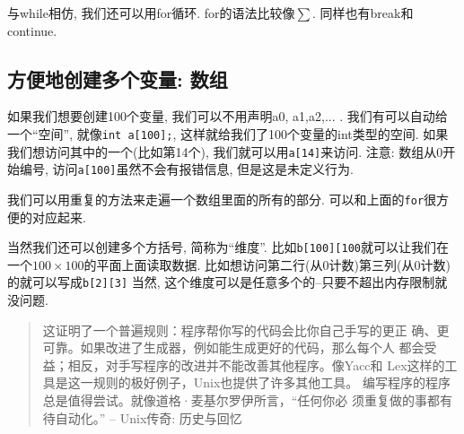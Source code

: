 与while相仿, 我们还可以用for循环. for的语法比较像$\sum$. 同样也有break和continue. 

\subsection{方便地创建多个变量: 数组}

如果我们想要创建100个变量, 我们可以不用声明a0, a1,a2,... . 我们有可以自动给一个``空间'', 就像\texttt{int a[100];}, 这样就给我们了100个变量的int类型的空间. 如果我们想访问其中的一个(比如第14个), 我们就可以用\texttt{a[14]}来访问. 注意: 数组从0开始编号, 访问\texttt{a[100]}虽然不会有报错信息, 但是这是未定义行为. 

我们可以用重复的方法来走遍一个数组里面的所有的部分. 可以和上面的\texttt{for}很方便的对应起来. 

当然我们还可以创建多个方括号, 简称为``维度''. 比如\texttt{b[100][100}就可以让我们在一个$100\times 100$的平面上面读取数据. 比如想访问第二行(从0计数)第三列(从0计数)的就可以写成\texttt{b[2][3]} 当然, 这个维度可以是任意多个的--只要不超出内存限制就没问题. 

\vspace{2cm}

\begin{quote}
	这证明了一个普遍规则：程序帮你写的代码会比你自己手写的更正 确、更可靠。如果改进了生成器，例如能生成更好的代码，那么每个人 都会受益；相反，对手写程序的改进并不能改善其他程序。像Yacc和
Lex这样的工具是这一规则的极好例子，Unix也提供了许多其他工具。 编写程序的程序总是值得尝试。就像道格·麦基尔罗伊所言，“任何你必 须重复做的事都有待自动化。”
\hfill -- Unix传奇: 历史与回忆
\end{quote}



